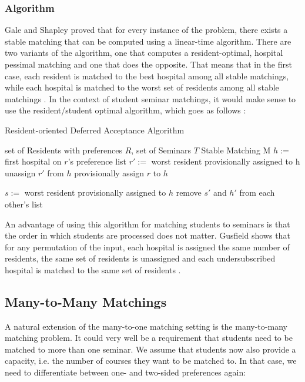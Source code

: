 \subsubsection{Algorithm}
Gale and Shapley \cite{GaleShapleyOrig} proved that for every instance of the problem, there exists a stable matching that can be computed using a linear-time algorithm. There are two variants of the algorithm, one that computes a resident-optimal, hospital pessimal matching and one that does the opposite. That means that in the first case, each resident is matched to the best hospital among all stable matchings, while each hospital is matched to the worst set of residents among all stable matchings \cite{Gusfield}. In the context of student seminar matchings, it would make sense to use the resident/student optimal algorithm, which goes as follows \cite{Gusfield}:
\begin{algorithm} %
    \caption{Resident-oriented Deferred Acceptance Algorithm} 
    \label{alg:resident-oriented-algorithm} 
    \begin{algorithmic} %
        \Require set of Residents with preferences $R$, set of Seminars $T$
        \Ensure Stable Matching M
        \State $h:=$ first hospital on $r$'s preference list
            \State $r':=$ worst resident provisionally assigned to h
            \State unassign $r'$ from $h$
        \EndIf
        \State provisionally assign $r$ to $h$

            $s:=$ worst resident provisionally assigned to $h$
                \State remove $s'$ and $h'$ from each other's list
            \EndFor
        \EndIf

        \EndWhile
    \end{algorithmic}
\end{algorithm}

An advantage of using this algorithm for matching students to seminars is that the order in which students are processed does not matter. Gusfield shows that for any permutation of the input, each hospital is assigned the same number of residents, the same set of residents is unassigned and each undersubscribed hospital is matched to the same set of residents \cite{Gusfield}.

\subsection{Many-to-Many Matchings}
A natural extension of the many-to-one matching setting is the many-to-many matching problem. It could very well be a requirement that students need to be matched to more than one seminar. We assume that students now also provide a capacity, i.e. the number of courses they want to be matched to. In that case, we need to differentiate between one- and two-sided preferences again:

